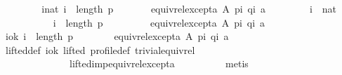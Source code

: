 \begin{isabellebody}
%
\isadelimproof
%
\endisadelimproof
%
\isatagproof
{}\isamarkupfalse%
\ {\isacharminus}{\kern0pt}\isanewline
\ \ \isamarkupfalse%
\isanewline
\ \ \ \ {\isachardoublequoteopen}{\isasymforall}i{\isacharcolon}{\kern0pt}{\isacharcolon}{\kern0pt}nat{\isachardot}{\kern0pt}\ i\ {\isacharless}{\kern0pt}\ length\ p\ {\isasymlongrightarrow}\isanewline
\ \ \ \ \ \ equiv{\isacharunderscore}{\kern0pt}rel{\isacharunderscore}{\kern0pt}except{\isacharunderscore}{\kern0pt}a\ A\ {\isacharparenleft}{\kern0pt}p{\isacharbang}{\kern0pt}i{\isacharparenright}{\kern0pt}\ {\isacharparenleft}{\kern0pt}q{\isacharbang}{\kern0pt}i{\isacharparenright}{\kern0pt}\ a{\isachardoublequoteclose}\isanewline
\ \ \isamarkupfalse%
\isanewline
\ \ \ \ \isamarkupfalse%
\ i\ {\isacharcolon}{\kern0pt}{\isacharcolon}{\kern0pt}\ nat\isanewline
\ \ \ \ \isamarkupfalse%
\isanewline
\ \ \ \ \ \ {\isachardoublequoteopen}i\ {\isacharless}{\kern0pt}\ length\ p\ {\isasymlongrightarrow}\isanewline
\ \ \ \ \ \ \ \ equiv{\isacharunderscore}{\kern0pt}rel{\isacharunderscore}{\kern0pt}except{\isacharunderscore}{\kern0pt}a\ A\ {\isacharparenleft}{\kern0pt}p{\isacharbang}{\kern0pt}i{\isacharparenright}{\kern0pt}\ {\isacharparenleft}{\kern0pt}q{\isacharbang}{\kern0pt}i{\isacharparenright}{\kern0pt}\ a{\isachardoublequoteclose}\isanewline
\ \ \ \ \isamarkupfalse%
\isanewline
\ \ \ \ \ \ \isamarkupfalse%
\ i{\isacharunderscore}{\kern0pt}ok{\isacharcolon}{\kern0pt}\ {\isachardoublequoteopen}i\ {\isacharless}{\kern0pt}\ length\ p{\isachardoublequoteclose}\isanewline
\ \ \ \ \ \ \isamarkupfalse%
\ {\isachardoublequoteopen}equiv{\isacharunderscore}{\kern0pt}rel{\isacharunderscore}{\kern0pt}except{\isacharunderscore}{\kern0pt}a\ A\ {\isacharparenleft}{\kern0pt}p{\isacharbang}{\kern0pt}i{\isacharparenright}{\kern0pt}\ {\isacharparenleft}{\kern0pt}q{\isacharbang}{\kern0pt}i{\isacharparenright}{\kern0pt}\ a{\isachardoublequoteclose}\isanewline
\ \ \ \ \ \ \ \ \isamarkupfalse%
\ lifted{\isacharunderscore}{\kern0pt}def\ i{\isacharunderscore}{\kern0pt}ok\ lifted\ profile{\isacharunderscore}{\kern0pt}def\ trivial{\isacharunderscore}{\kern0pt}equiv{\isacharunderscore}{\kern0pt}rel\isanewline
\ \ \ \ \ \ \ \ \ \ \ \ \ \ lifted{\isacharunderscore}{\kern0pt}imp{\isacharunderscore}{\kern0pt}equiv{\isacharunderscore}{\kern0pt}rel{\isacharunderscore}{\kern0pt}except{\isacharunderscore}{\kern0pt}a\isanewline
\ \ \ \ \ \ \ \ \isamarkupfalse%
\ metis\isanewline
\ \ \ \ \isamarkupfalse%

\end{isabellebody}
